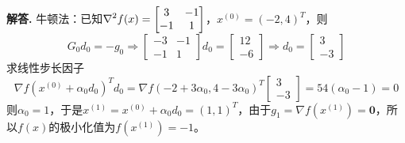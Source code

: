 \documentclass[12pt, a4paper, oneside]{ctexart}
\newenvironment{solution}{\par\noindent\textbf{解答. }}{\bigskip\par}
\begin{document}
\begin{solution}
    牛顿法：已知$\displaystyle\nabla^2f(x) = \left[\begin{matrix}
        3&-1\\-1&1
    \end{matrix}\right]$，$x^{(0)} = (-2,4)^T$，则
    \begin{equation*}
        G_0d_0 = -g_0\Rightarrow \left[\begin{matrix}
            -3&-1\\-1&1
        \end{matrix}\right]d_0=\left[\begin{matrix}
            12\\-6
        \end{matrix}\right]\Rightarrow d_0 = \left[\begin{matrix}
            3\\-3
        \end{matrix}\right]
    \end{equation*}
    求线性步长因子
    \begin{equation*}
        \nabla f(x^{(0)} + \alpha_0d_0)^Td_0 = \nabla f(-2+3\alpha_0, 4-3\alpha_0)^T\left[\begin{matrix}
            3\\-3
        \end{matrix}\right] = 54(\alpha_0-1) = 0
    \end{equation*}
    则$\alpha_0 = 1$，于是$x^{(1)} = x^{(0)} + \alpha_0d_0 = (1, 1)^T$，由于$g_1 = \nabla f(x^{(1)}) = \mathbf{0}$，所以$f(x)$的极小化值为$f(x^{(1)}) = -1$。
\end{solution}
\end{document}
